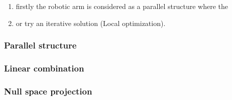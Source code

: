 \begin{enumerate}
	\item firstly the robotic arm is considered as a parallel structure where the 
	\item or try an iterative solution (Local optimization).
\end{enumerate}

\subsubsection{Parallel structure}

\subsubsection{Linear combination}

\subsubsection{Null space projection}
\label{section:nsprojection}